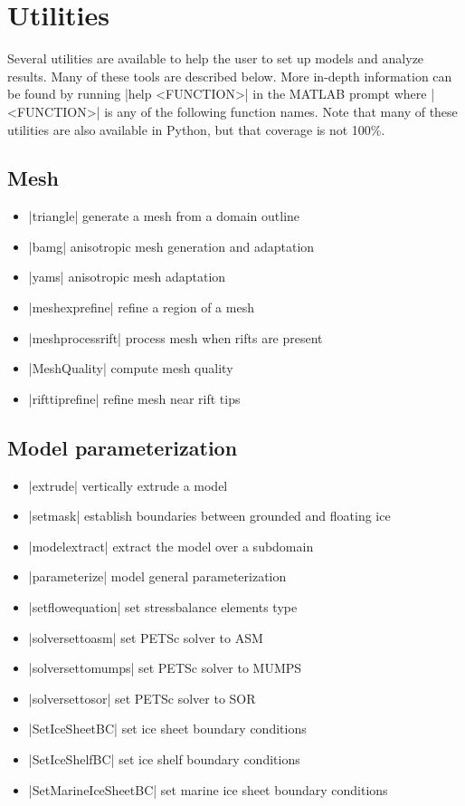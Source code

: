 
\section{Utilities} \label{sec:supplements-utilities}
Several utilities are available to help the user to set up models and analyze results. Many of these tools are described below. More in-depth information can be found by running \lstinlinebg|help <FUNCTION>| in the MATLAB prompt where \lstinlinebg|<FUNCTION>| is any of the following function names. Note that many of these utilities are also available in Python, but that coverage is not 100\%.

\subsection{Mesh}
\begin{itemize}
\item \lstinlinebg|triangle| generate a mesh from a domain outline
\item \lstinlinebg|bamg| anisotropic mesh generation and adaptation
\item \lstinlinebg|yams| anisotropic mesh adaptation
\item \lstinlinebg|meshexprefine| refine a region of a mesh
\item \lstinlinebg|meshprocessrift| process mesh when rifts are present
\item \lstinlinebg|MeshQuality| compute mesh quality
\item \lstinlinebg|rifttiprefine| refine mesh near rift tips
\end{itemize}

\subsection{Model parameterization}
\begin{itemize}
\item \lstinlinebg|extrude| vertically extrude a model
\item \lstinlinebg|setmask| establish boundaries between grounded and floating ice
\item \lstinlinebg|modelextract| extract the model over a subdomain
\item \lstinlinebg|parameterize| model general parameterization
\item \lstinlinebg|setflowequation| set stressbalance elements type
\item \lstinlinebg|solversettoasm| set PETSc solver to ASM
\item \lstinlinebg|solversettomumps| set PETSc solver to MUMPS
\item \lstinlinebg|solversettosor| set PETSc solver to SOR
\item \lstinlinebg|SetIceSheetBC| set ice sheet boundary conditions
\item \lstinlinebg|SetIceShelfBC| set ice shelf boundary conditions
\item \lstinlinebg|SetMarineIceSheetBC| set marine ice sheet boundary conditions
\end{itemize}


